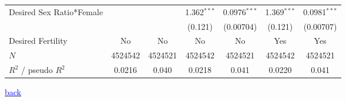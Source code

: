\documentclass[9pt,letterpaper,subeqn]{beamer}
\begin{document}
\begin{frame}[label=DSRIMR]
\begin{table}[h!]
{\begin{tabular}{l*{6}{c}}
Desired Sex Ratio*Female&                     &                     &       1.362$^{***}$&      0.0976$^{***}$&       1.369$^{***}$&      0.0981$^{***}$\\
            &                     &                     &     (0.121)         &   (0.00704)         &     (0.121)         &   (0.00707)         \\


\hline
Desired Fertility&     No         &         No         &     No         &     No         &     Yes         &         Yes         \\
\hline
\(N\)       &     4524542         &     4524521         &     4524542         &     4524521         &     4524542         &     4524521         \\
$R^{2}$  / pseudo $R^{2}$& 0.0216  &       0.040         & 0.0218             &       0.041         &     0.0220          &       0.041         \\
\bottomrule
\end{tabular}}
\end{table}
{\footnotesize \hyperlink{DSR}{\textcolor{blue}{back}}}
\end{frame}




\end{document}
